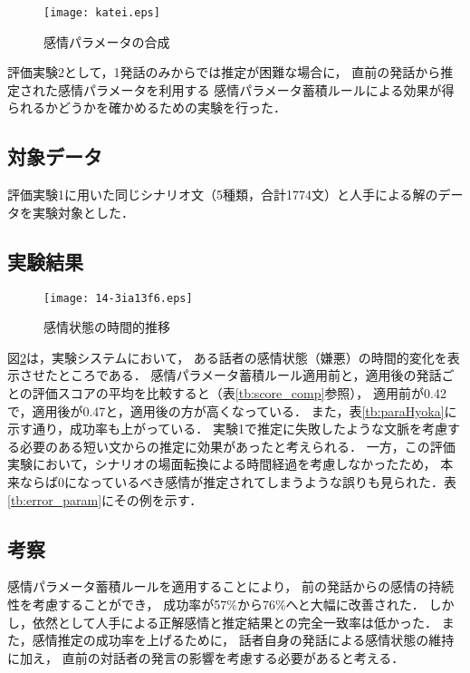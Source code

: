 \documentclass[japanese]{jnlp_1.3c}
\begin{document}
\begin{figure}[b]
\vspace{\baselineskip}
\begin{center}
    \texttt{[image: katei.eps]}
\caption{感情パラメータの合成}
\label{fig:katei}
\end{center}
\end{figure}


評価実験2として，1発話のみからでは推定が困難な場合に，
直前の発話から推定された感情パラメータを利用する
感情パラメータ蓄積ルールによる効果が得られるかどうかを確かめるための実験を行った．

\subsection{対象データ}

評価実験1に用いた同じシナリオ文（5種類，合計1774文）と人手による解のデータを実験対象とした．

\subsection{実験結果}

\begin{figure}[b]
\begin{center}
    \texttt{[image: 14-3ia13f6.eps]}
\caption{感情状態の時間的推移}
\label{fig:etra}
\end{center}
\end{figure}

図\ref{fig:etra}は，実験システムにおいて，
ある話者の感情状態（嫌悪）の時間的変化を表示させたところである．
感情パラメータ蓄積ルール適用前と，適用後の発話ごとの評価スコアの平均を比較すると（表\ref{tb:score_comp}参照），
適用前が0.42で，適用後が0.47と，適用後の方が高くなっている．
また，表\ref{tb:paraHyoka}に示す通り，成功率も上がっている．
実験1で推定に失敗したような文脈を考慮する必要のある短い文からの推定に効果があったと考えられる．
一方，この評価実験において，シナリオの場面転換による時間経過を考慮しなかったため，
本来ならば0になっているべき感情が推定されてしまうような誤りも見られた．表\ref{tb:error_param}にその例を示す．


\subsection{考察}

感情パラメータ蓄積ルールを適用することにより，
前の発話からの感情の持続性を考慮することができ，
成功率が57\%から76\%へと大幅に改善された．
しかし，依然として人手による正解感情と推定結果との完全一致率は低かった．
また，感情推定の成功率を上げるために，
話者自身の発話による感情状態の維持に加え，
直前の対話者の発言の影響を考慮する必要があると考える．
\end{document}
